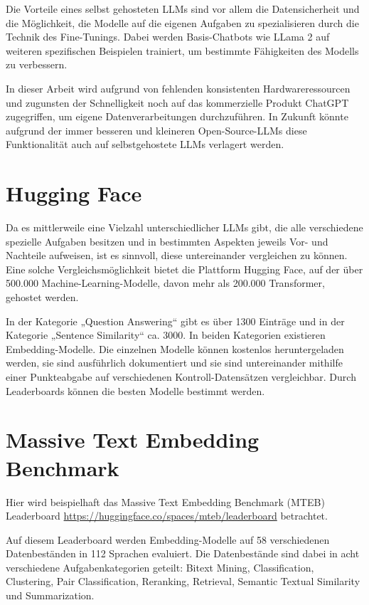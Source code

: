 Die Vorteile eines selbst gehosteten LLMs sind vor allem die Datensicherheit und die Möglichkeit, die Modelle auf die eigenen Aufgaben zu spezialisieren durch die Technik des Fine-Tunings.
Dabei werden Basis-Chatbots wie LLama 2 auf weiteren spezifischen Beispielen trainiert, um bestimmte Fähigkeiten des Modells zu verbessern.

In dieser Arbeit wird aufgrund von fehlenden konsistenten Hardwareressourcen und zugunsten der Schnelligkeit noch auf das kommerzielle Produkt ChatGPT zugegriffen, um eigene Datenverarbeitungen durchzuführen.
In Zukunft könnte aufgrund der immer besseren und kleineren Open-Source-LLMs diese Funktionalität auch auf selbstgehostete LLMs verlagert werden.

\section{Hugging Face}

Da es mittlerweile eine Vielzahl unterschiedlicher LLMs gibt, die alle verschiedene spezielle Aufgaben besitzen und in bestimmten Aspekten jeweils Vor- und Nachteile aufweisen, ist es sinnvoll, diese untereinander vergleichen zu können.
Eine solche Vergleichsmöglichkeit bietet die Plattform Hugging Face, auf der über 500.000 Machine-Learning-Modelle, davon mehr als 200.000 Transformer, gehostet werden.

In der Kategorie „Question Answering“ gibt es über 1300 Einträge und in der Kategorie „Sentence Similarity“ ca. 3000.
In beiden Kategorien existieren Embedding-Modelle.
Die einzelnen Modelle können kostenlos heruntergeladen werden, sie sind ausführlich dokumentiert und sie sind untereinander mithilfe einer Punkteabgabe auf verschiedenen Kontroll-Datensätzen vergleichbar.
Durch Leaderboards können die besten Modelle bestimmt werden.

\section{Massive Text Embedding Benchmark}

Hier wird beispielhaft das Massive Text Embedding Benchmark (MTEB) Leaderboard \url{https://huggingface.co/spaces/mteb/leaderboard} betrachtet.

Auf diesem Leaderboard werden Embedding-Modelle auf 58 verschiedenen Datenbeständen in 112 Sprachen evaluiert.
Die Datenbestände sind dabei in acht verschiedene Aufgabenkategorien geteilt:
Bitext Mining, Classification, Clustering, Pair Classification, Reranking, Retrieval, Semantic Textual Similarity und Summarization.

